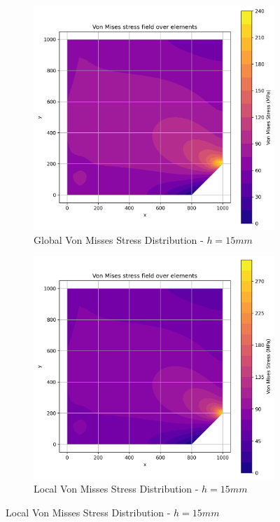 \begin{figure}[H]
  \centering
  \begin{subfigure}[b]{0.45\textwidth}
    \centering
    \includegraphics[width=\textwidth]{GRAFICOS/Quad9/1.75mm_global/resultados_von_mises.png}
    \caption{Global Von Misses Stress Distribution - $h=15mm$}
    \label{fig:img11}
  \end{subfigure}
  \hfill
  \begin{subfigure}[b]{0.45\textwidth}
    \centering
    \includegraphics[width=\textwidth]{GRAFICOS/Quad9/1.75mm_local/resultados_von_mises.png}
    \caption{Local Von Misses Stress Distribution - $h=15mm$}
    \label{fig:img21}
  \end{subfigure}
\end{figure}

